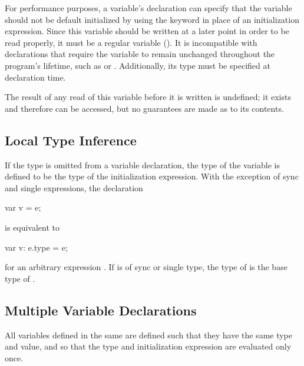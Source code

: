 For performance purposes, a variable's declaration can specify that
the variable should not be default initialized by using
the  keyword in place of an initialization expression.
Since this variable should be written at a later point in order to be
read properly, it must be a regular variable ().  It is
incompatible with declarations that require the variable to remain
unchanged throughout the program's lifetime, such as 
or .  Additionally, its type must be specified at
declaration time.

The result of any read of this variable before it is written is
undefined; it exists and therefore can be accessed, but no guarantees
are made as to its contents.

\subsection{Local Type Inference}
\label{Local_Type_Inference}

If the type is omitted from a variable declaration, the type of the
variable is defined to be the type of the initialization expression.
With the exception of sync and single expressions, the declaration
\begin{chapel}
var v = e;
\end{chapel}
is equivalent to
\begin{chapel}
var v: e.type = e;
\end{chapel}
for an arbitrary expression .  If  is of sync or
single type, the type of  is the base type of .

\subsection{Multiple Variable Declarations}
\label{Multiple_Variable_Declarations}

All variables defined in the same  are defined
such that they have the same type and value, and so that the type and
initialization expression are evaluated only once.

